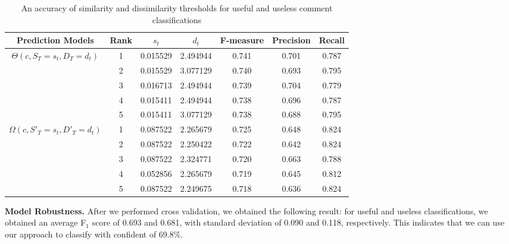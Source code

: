 \begin{table*}[!t]
\caption{An accuracy of similarity and dissimilarity thresholds for useful and useless comment classifications}
\small
\centering
\def\arraystretch{1.2}
\begin{tabular}{ccccccc}
\hline
Prediction Models  & Rank & $s_t$ & $d_t$ & F-measure & Precision & Recall \\ \hline \hline
\multirow{5}{*}{$\Theta(c,S_T=s_t,D_T=d_t)$}
& 1 & 0.015529 & 2.494944 & 0.741 & 0.701 & 0.787 \\ \cline{2-7}
& 2 & 0.015529 & 3.077129 & 0.740 & 0.693 & 0.795 \\ \cline{2-7}
& 3 & 0.016713 & 2.494944 & 0.739 & 0.704 & 0.779 \\ \cline{2-7}
& 4 & 0.015411 & 2.494944 & 0.738 & 0.696 & 0.787 \\ \cline{2-7}
& 5 & 0.015411 & 3.077129 & 0.738 & 0.688 & 0.795
\\ \hline \hline
\multirow{5}{*}{$\Omega(c,S'_T=s_t,D'_T=d_t)$}
& 1 & 0.087522 & 2.265679 & 0.725 & 0.648 & 0.824 \\ \cline{2-7}
& 2 & 0.087522 & 2.250422 & 0.722 & 0.642 & 0.824 \\ \cline{2-7}
& 3 & 0.087522 & 2.324771 & 0.720 & 0.663 & 0.788 \\ \cline{2-7}
& 4 & 0.052856 & 2.265679 & 0.719 & 0.645 & 0.812 \\ \cline{2-7}
& 5 & 0.087522 & 2.249675 & 0.718 & 0.636 & 0.824
\\ \hline
\end{tabular}
\label{tb:thresholds}
\end{table*}

\textbf{Model Robustness.} After we performed cross validation, we obtained the following result:
for useful and useless classifications,
we obtained an average F$_1$ score of 0.693 and 0.681,
with standard deviation of 0.090 and 0.118, respectively.
This indicates that we can use our approach to classify with confident of 69.8\%.
 

